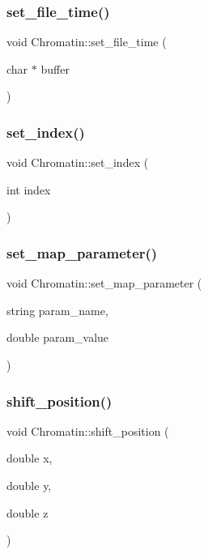 \subsubsection{\texorpdfstring{set\_file\_time()}{set\_file\_time()}}
{\footnotesize\ttfamily void Chromatin\+::set\+\_\+file\+\_\+time (\begin{DoxyParamCaption}\item[{char $\ast$}]{buffer }\end{DoxyParamCaption})\hspace{0.3cm}{\ttfamily [inline]}}

\mbox{\label{classChromatin_a58851cf29ad04948463857c99103ccd2}} 
\subsubsection{\texorpdfstring{set\_index()}{set\_index()}}
{\footnotesize\ttfamily void Chromatin\+::set\+\_\+index (\begin{DoxyParamCaption}\item[{int}]{index }\end{DoxyParamCaption})\hspace{0.3cm}{\ttfamily [inline]}}

\mbox{\label{classChromatin_a6c1fdee78f6bc75784b8d11a5073e7dc}} 
\subsubsection{\texorpdfstring{set\_map\_parameter()}{set\_map\_parameter()}}
{\footnotesize\ttfamily void Chromatin\+::set\+\_\+map\+\_\+parameter (\begin{DoxyParamCaption}\item[{string}]{param\+\_\+name,  }\item[{double}]{param\+\_\+value }\end{DoxyParamCaption})}

\mbox{\label{classChromatin_a701278cbb0c1014ae62f479e2a9f6737}} 
\subsubsection{\texorpdfstring{shift\_position()}{shift\_position()}}
{\footnotesize\ttfamily void Chromatin\+::shift\+\_\+position (\begin{DoxyParamCaption}\item[{double}]{x,  }\item[{double}]{y,  }\item[{double}]{z }\end{DoxyParamCaption})\hspace{0.3cm}{\ttfamily [inline]}}


